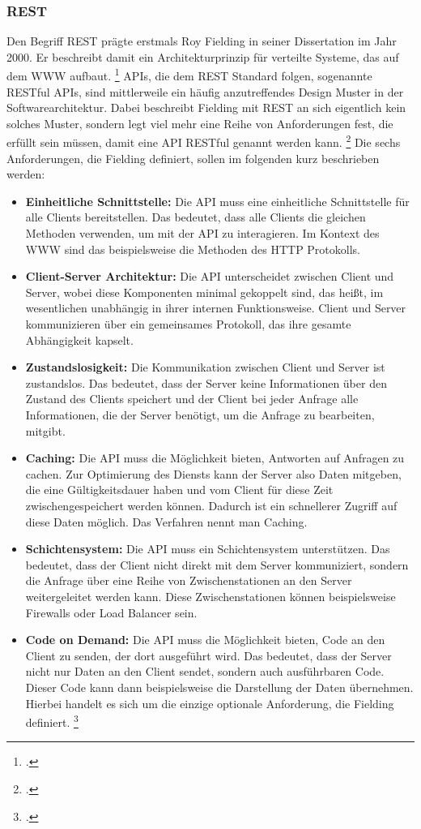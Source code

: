 \subsubsection*{REST}
Den Begriff \ac{REST} prägte erstmals Roy Fielding in seiner Dissertation im Jahr 2000. Er beschreibt damit ein Architekturprinzip für verteilte Systeme, das auf dem \ac{WWW} aufbaut. \footcite[Vgl. ][S. 76]{REST2000} \ac{API}s, die dem REST Standard folgen, sogenannte \ac{REST}ful \ac{API}s, sind mittlerweile ein häufig anzutreffendes Design Muster in der Softwarearchitektur. Dabei beschreibt Fielding mit \ac{REST} an sich eigentlich kein solches Muster, sondern legt viel mehr eine Reihe von Anforderungen fest, die erfüllt sein müssen, damit eine \ac{API} \ac{REST}ful genannt werden kann. \footcite[Vgl. ][S. XV]{richardson2007web} Die sechs Anforderungen, die Fielding definiert, sollen im folgenden kurz beschrieben werden:
\begin{itemize}
  \item 
  \textbf{Einheitliche Schnittstelle:} Die \ac{API} muss eine einheitliche Schnittstelle für alle Clients bereitstellen. Das bedeutet, dass alle Clients die gleichen Methoden verwenden, um mit der \ac{API} zu interagieren. Im Kontext des \ac{WWW} sind das beispielsweise die Methoden des \ac{HTTP} Protokolls.
  \item \textbf{Client-Server Architektur:} Die \ac{API} unterscheidet zwischen Client und Server, wobei diese Komponenten minimal gekoppelt sind, das heißt, im wesentlichen unabhängig in ihrer internen Funktionsweise. Client und Server kommunizieren über ein gemeinsames Protokoll, das ihre gesamte Abhängigkeit kapselt.
  \item \textbf{Zustandslosigkeit:} Die Kommunikation zwischen Client und Server ist zustandslos. Das bedeutet, dass der Server keine Informationen über den Zustand des Clients speichert und der Client bei jeder Anfrage alle Informationen, die der Server benötigt, um die Anfrage zu bearbeiten, mitgibt. 
  \item \textbf{Caching:} Die \ac{API} muss die Möglichkeit bieten, Antworten auf Anfragen zu cachen. Zur Optimierung des Diensts kann der Server also Daten mitgeben, die eine Gültigkeitsdauer haben und vom Client für diese Zeit zwischengespeichert werden können. Dadurch ist ein schnellerer Zugriff auf diese Daten möglich. Das Verfahren nennt man Caching.
  \item \textbf{Schichtensystem:} Die \ac{API} muss ein Schichtensystem unterstützen. Das bedeutet, dass der Client nicht direkt mit dem Server kommuniziert, sondern die Anfrage über eine Reihe von Zwischenstationen an den Server weitergeleitet werden kann. Diese Zwischenstationen können beispielsweise Firewalls oder Load Balancer sein.
  \item \textbf{Code on Demand:} Die \ac{API} muss die Möglichkeit bieten, Code an den Client zu senden, der dort ausgeführt wird. Das bedeutet, dass der Server nicht nur Daten an den Client sendet, sondern auch ausführbaren Code. Dieser Code kann dann beispielsweise die Darstellung der Daten übernehmen. Hierbei handelt es sich um die einzige optionale Anforderung, die Fielding definiert.
  \footcite[Vgl. ][]{redhat_2020_was}
\end{itemize}

